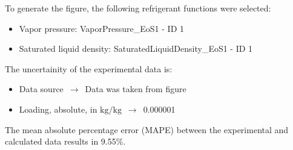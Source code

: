 To generate the figure, the following refrigerant functions were selected:
\begin{itemize}
\item Vapor pressure: VaporPressure\_EoS1 - ID 1
\item Saturated liquid density: SaturatedLiquidDensity\_EoS1 - ID 1
\end{itemize}

The uncertainity of the experimental data is:
\begin{itemize}
\item Data source $\,\to\,$ Data was taken from figure
\item Loading, absolute, in $\si{\kilogram\per\kilogram}$ $\,\to\,$ 0.000001
\end{itemize}

The mean absolute percentage error (MAPE) between the experimental and calculated data results in 9.55\%.
\FloatBarrier
\newpage
